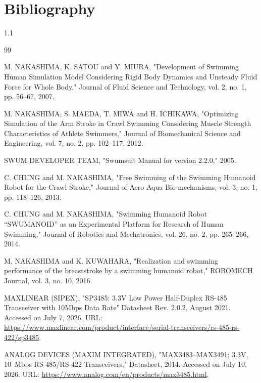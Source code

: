\documentclass{tropLaClasse}
\begin{document}
\section*{Bibliography}

\begin{spacing}{1.1}
\begin{thebibliography}{99}
\setlength{\itemsep}{0pt}

\vspace{-0.5cm}

 M. NAKASHIMA, K. SATOU and Y. MIURA, "Development of Swimming Human Simulation Model Considering Rigid Body Dynamics and Unsteady Fluid Force for Whole Body," Journal of Fluid Science and Technology, vol. 2, no. 1, pp. 56--67, 2007.

 M. NAKASHIMA, S. MAEDA, T. MIWA and H. ICHIKAWA, "Optimizing Simulation of the Arm Stroke in Crawl Swimming Considering Muscle Strength Characteristics of Athlete Swimmers," Journal of Biomechanical Science and Engineering, vol. 7, no. 2, pp. 102--117, 2012.

 SWUM DEVELOPER TEAM, "Swumsuit Manual for version 2.2.0," 2005.

 C. CHUNG and M. NAKASHIMA, "Free Swimming of the Swimming Humanoid Robot for the Crawl Stroke," Journal of Aero Aqua Bio-mechanisms, vol. 3, no. 1, pp. 118--126, 2013.

 C. CHUNG and M. NAKASHIMA, "Swimming Humanoid Robot “SWUMANOID” as an Experimental Platform for Research of Human Swimming," Journal of Robotics and Mechatronics, vol. 26, no. 2, pp. 265--266, 2014.

 M. NAKASHIMA and K. KUWAHARA, "Realization and swimming performance of the breaststroke by a swimming humanoid robot," ROBOMECH Journal, vol. 3, no. 10, 2016.

 MAXLINEAR (SIPEX), "SP3485: 3.3V Low Power Half-Duplex RS-485 Transceiver with 10Mbps Data Rate" Datasheet Rev. 2.0.2, August 2021. Accessed on July 7, 2026. URL: \url{https://www.maxlinear.com/product/interface/serial-transceivers/rs-485-rs-422/sp3485}.

 ANALOG DEVICES (MAXIM INTEGRATED), "MAX3483--MAX3491: 3.3V, 10~Mbps RS-485/RS-422 Transceivers," Datasheet, 2014. Accessed on July 10, 2026. URL: \url{https://www.analog.com/en/products/max3485.html}.


\end{thebibliography}
\end{spacing}
\end{document}

